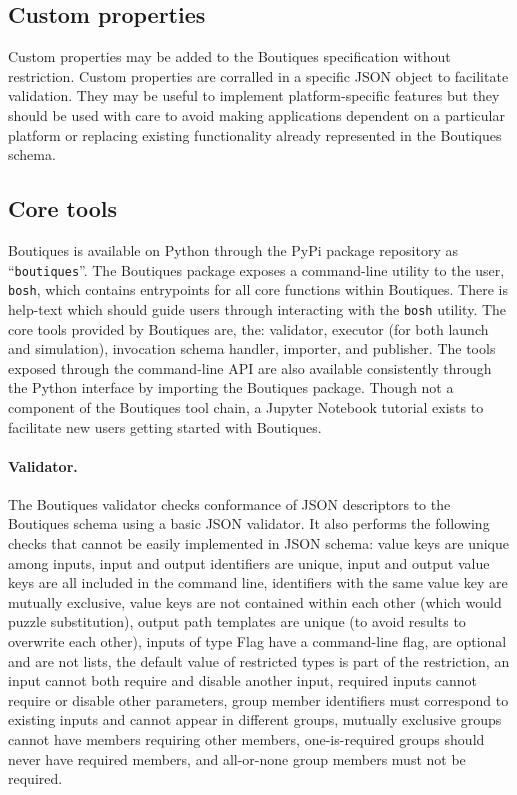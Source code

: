 \documentclass{article}
\newcommand{\boutiques}{Boutiques\xspace}
\begin{document}
\subsection{Custom properties}

Custom properties may be added to the Boutiques specification without
restriction. Custom properties are corralled in a specific JSON object
to facilitate validation. They may be useful to implement
platform-specific features but they should be used with care to avoid
making applications dependent on a particular platform or replacing
existing functionality already represented in the \boutiques schema.

\subsection{Core tools} 

\boutiques is available on Python through the PyPi package repository
as ``\texttt{boutiques}''. The \boutiques package exposes a
command-line utility to the user, \texttt{bosh}, which contains
entrypoints for all core functions within \boutiques. There is
help-text which should guide users through interacting with the
\texttt{bosh} utility. The core tools provided by \boutiques are, the:
validator, executor (for both launch and simulation), invocation
schema handler, importer, and publisher. The tools exposed through the
command-line API are also available consistently through the Python
interface by importing the \boutiques package. Though not a component
of the \boutiques tool chain, a Jupyter Notebook tutorial exists to
facilitate new users getting started with \boutiques.

\paragraph{Validator.} The \boutiques validator checks conformance of JSON
descriptors to the \boutiques schema using a basic JSON validator. It
also performs the following checks that cannot be easily implemented
in JSON schema: value keys are unique among inputs, input and output
identifiers are unique, input and output value keys are all included
in the command line, identifiers with the same value key are mutually
exclusive, value keys are not contained within each other (which would
puzzle substitution), output path templates are unique (to avoid
results to overwrite each other), inputs of type Flag have a
command-line flag, are optional and are not lists, the default value
of restricted types is part of the restriction, an input cannot both
require and disable another input, required inputs cannot require or
disable other parameters, group member identifiers must correspond to
existing inputs and cannot appear in different groups, mutually
exclusive groups cannot have members requiring other members,
one-is-required groups should never have required members, and
all-or-none group members must not be required.
\end{document}
